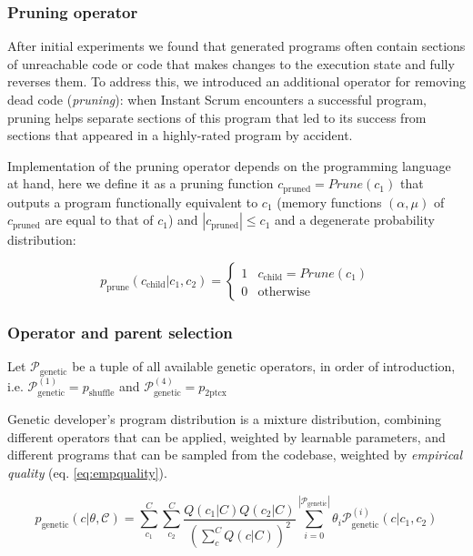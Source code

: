 \subsubsection{Pruning operator}

After initial experiments  we found that generated programs often contain sections of unreachable code or code that makes changes to the execution state and fully reverses them.
To address this, we introduced an additional operator for removing dead code (\emph{pruning}): when Instant Scrum encounters a successful program, pruning helps separate sections of this program that led to its success from sections that appeared in a highly-rated program by accident.  

Implementation of the pruning operator depends on the programming language at hand, here we define it as a pruning function $c_\text{pruned}=\mathit{Prune}(c_1)$ that outputs a program functionally equivalent to $c_1$ (memory functions $(\alpha,\mu)$ of $c_\text{pruned}$ are equal to that of $c_1$) and $|c_\text{pruned}| \leq c_1$ and a degenerate probability distribution:

\begin{equation}
    p_\text{prune}(c_\text{child}|c_1,c_2)= \begin{cases}
        1 & c_\text{child} = \mathit{Prune}(c_1) \\
        0 & \text{otherwise}
        \end{cases}
\end{equation}

\subsubsection{Operator and parent selection}
\label{sec:selection}

Let $\mathcal{P}_\text{genetic}$ be a tuple of all available genetic operators, in order of introduction, i.e. $\mathcal{P}_\text{genetic}^{(1)}=p_\text{shuffle}$ and $\mathcal{P}_\text{genetic}^{(4)}=p_\text{2ptcx}$

Genetic developer's program distribution is a mixture distribution, combining different operators that can be applied, weighted by learnable parameters, and different programs that can be sampled from the codebase, weighted by \emph{empirical quality} (eq. \ref{eq:empquality}).

\begin{equation}
    p_\text{genetic}(c | \theta, \mathcal{C}) = 
    \sum\limits_{c_1}^{C}  
    \sum\limits_{c_2}^{C} 
    \frac{Q(c_1|C) Q(c_2|C)}{(\sum\limits_{c}^{C} Q(c|C))^2} 
    \sum\limits_{i=0}^{|\mathcal{P}_\text{genetic}|} 
    \theta_i \mathcal{P}_\text{genetic}^{(i)} (c|c_1,c_2)
    \label{eq:genmixture}
\end{equation}

